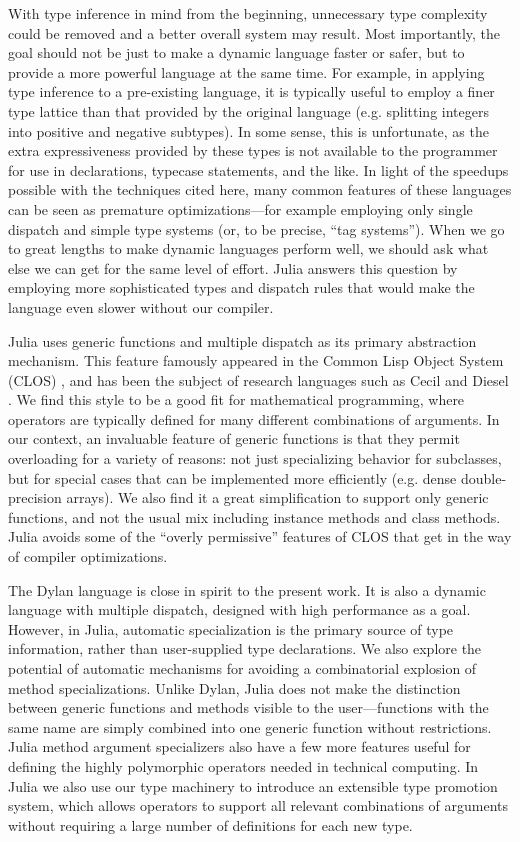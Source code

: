 With type inference in mind from the beginning, unnecessary type complexity
could be removed and a better overall system may result.
Most importantly, the goal should not be just to make a dynamic language
faster or safer, but to provide a more powerful language at the same time.
For example, in applying type inference to a pre-existing language, it is
typically useful
to employ a finer type lattice than that provided by the original language
(e.g. splitting integers into positive and negative subtypes).
In some sense, this is unfortunate, as the
extra expressiveness provided by these types is not available to the programmer
for use in declarations, typecase statements, and the like.
In light of the speedups possible with the techniques cited here, many common
features of these languages can be seen as premature optimizations---for
example employing only single dispatch and simple type systems (or, to be
precise, ``tag systems''). When we go to great lengths to make dynamic
languages perform well, we should ask what else we can get for the same
level of effort. Julia answers this question by employing more
sophisticated types and dispatch rules that would make the language even
slower without our compiler.

Julia uses generic functions and multiple dispatch as its primary
abstraction mechanism. This feature famously appeared in the Common Lisp
Object System (CLOS) \cite{closoverview} \cite{closspec}, and has been the
subject of research languages such as Cecil \cite{cecil} and
Diesel \cite{dieselspec}. We find this style to be a good fit for
mathematical programming, where operators are typically defined for many
different combinations of arguments. In our context, an invaluable
feature of generic functions is that they permit overloading for a variety
of reasons: not just specializing behavior for subclasses, but for
special cases
that can be implemented more efficiently (e.g. dense double-precision
arrays). We also find it a great simplification to support only
generic functions, and not the usual mix including instance methods and
class methods. Julia avoids some of the ``overly permissive'' features of
CLOS \cite{clostrophobia} that get in the way of compiler optimizations.

The Dylan language \cite{dylanlang} is close in spirit to
the present work. It is also a dynamic language with multiple dispatch,
designed with high performance as a goal. However, in Julia,
automatic specialization is the primary source of type information, rather
than user-supplied type declarations. We also explore the potential of
automatic mechanisms for avoiding a combinatorial explosion of method
specializations.
Unlike Dylan, Julia does not make the distinction between generic functions
and methods visible to the user---functions with the same name are simply
combined into one generic function without restrictions.
Julia method argument specializers also have a few more features
useful for defining the highly polymorphic operators needed in technical
computing. In Julia we also use our type machinery to introduce an
extensible type promotion system, which allows operators to support all
relevant combinations of arguments without requiring a large number
of definitions for each new type.

